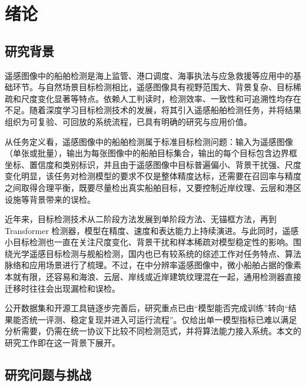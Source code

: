 \section{绪论}\label{sec:introduction}

\subsection{研究背景}

遥感图像中的船舶检测是海上监管、港口调度、海事执法与应急救援等应用中的基础环节。与自然场景目标检测相比，遥感图像具有视野范围大、背景复杂、目标稀疏和尺度变化显著等特点。依赖人工判读时，检测效率、一致性和可追溯性均存在不足。随着深度学习目标检测技术的发展，将其引入遥感船舶检测任务，并将结果组织为可复验、可回放的系统流程，已具有明确的研究与应用价值。

从任务定义看，遥感图像中的船舶检测属于标准目标检测问题：输入为遥感图像（单张或批量），输出为每张图像中的船舶目标集合，输出的每个目标包含边界框坐标、置信度和类别标识，并且由于遥感图像中目标普遍偏小、背景干扰强、尺度变化明显，该任务对检测模型的要求不仅是整体精度达标，还需要在召回率与精度之间取得合理平衡，既要尽量检出真实船舶目标，又要控制近岸纹理、云层和港区设施等背景带来的误检。

近年来，目标检测技术从二阶段方法发展到单阶段方法、无锚框方法，再到 Transformer 检测器，模型在精度、速度和表达能力上持续演进\cite{ren2015_fasterrcnn,lin2017_fpn,lin2017_focalloss,tian2019_fcos,redmon2016_yolo,carion2020_detr,zhu2021_deformabledetr}。与此同时，遥感小目标检测也一直在关注尺度变化、背景干扰和样本稀疏对模型稳定性的影响\cite{wang2023_sod_review,zhao2024_shipsurvey,du2022_small_object_review_cn,liao2023_small_target_review_cn}。围绕光学遥感目标检测与舰船检测，国内也已有较系统的综述工作对任务特点、算法脉络和应用场景进行了梳理\cite{wang2011_ship_detection_cn,xu2021_vessel_detection_cn,song2021_ship_survey_cn,liao2022_optical_rs_detection_cn,huang2023_ship_detection_survey_cn}。不过，在中分辨率遥感图像中，微小船舶占据的像素本就有限，还容易和海浪、云层、岸线或近岸建筑纹理混在一起，通用检测器直接迁移时往往会出现漏检和误检。

公开数据集和开源工具链逐步完善后，研究重点已由“模型能否完成训练”转向“结果能否统一评测、稳定复现并进入可运行流程”。仅给出单一模型指标已难以满足分析需要，仍需在统一协议下比较不同检测范式，并将算法能力接入系统。本文的研究工作即在这一背景下展开。

\subsection{研究问题与挑战}

